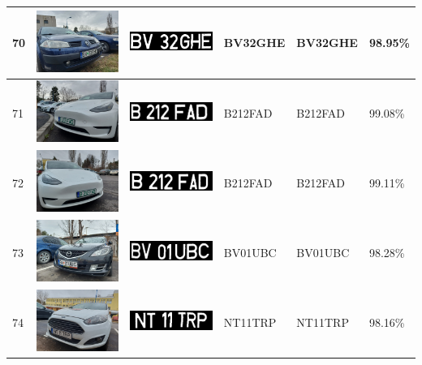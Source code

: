 \documentclass[a4paper,12pt]{report}
\begin{document}
\begin{longtable}{| m{0.6cm} | m{3cm} | m{3cm} | m{1.8cm} | m{1.8cm} | m{1.8cm} |}
        70 & \includegraphics[width=3cm,keepaspectratio]{dataset/39_s1.jpg} & \includegraphics[width=3cm,keepaspectratio]{segmentari/70.jpg} & BV32GHE & BV32GHE & 98.95\% \\ \hline
        71 & \includegraphics[width=3cm,keepaspectratio]{dataset/40_d1.jpg} & \includegraphics[width=3cm,keepaspectratio]{segmentari/71.jpg} & B212FAD & B212FAD & 99.08\% \\ \hline
        72 & \includegraphics[width=3cm,keepaspectratio]{dataset/40_s1.jpg} & \includegraphics[width=3cm,keepaspectratio]{segmentari/72.jpg} & B212FAD & B212FAD & 99.11\% \\ \hline
        73 & \includegraphics[width=3cm,keepaspectratio]{dataset/41_d1.jpg} & \includegraphics[width=3cm,keepaspectratio]{segmentari/73.jpg} & BV01UBC & BV01UBC & 98.28\% \\ \hline
        74 & \includegraphics[width=3cm,keepaspectratio]{dataset/42_d1.jpg} & \includegraphics[width=3cm,keepaspectratio]{segmentari/74.jpg} & NT11TRP & NT11TRP & 98.16\% \\ \hline

\end{longtable}
\end{document}

